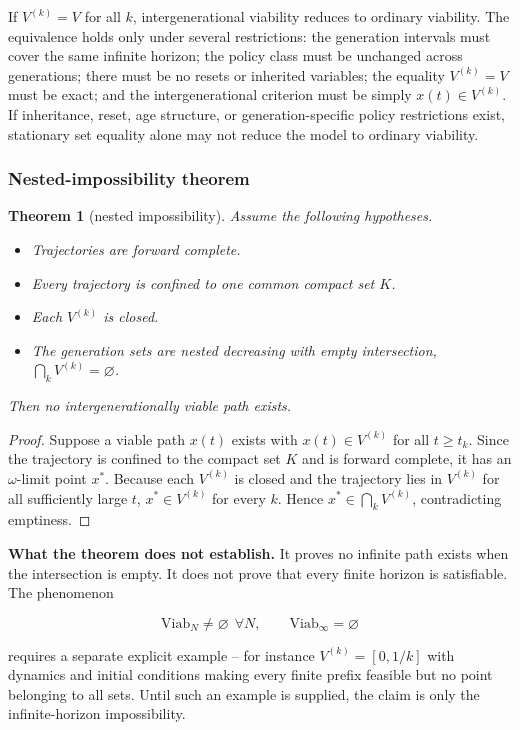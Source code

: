 \documentclass[preprint,11pt,authoryear]{elsarticle}
\newtheorem{theorem}{Theorem}
\theoremstyle{remark}
\begin{document}
If $V^{(k)} = V$ for all $k$, intergenerational viability reduces to ordinary viability. The equivalence holds only under several restrictions: the generation intervals must cover the same infinite horizon; the policy class must be unchanged across generations; there must be no resets or inherited variables; the equality $V^{(k)} = V$ must be exact; and the intergenerational criterion must be simply $x(t) \in V^{(k)}$. If inheritance, reset, age structure, or generation-specific policy restrictions exist, stationary set equality alone may not reduce the model to ordinary viability.

\subsubsection{Nested-impossibility theorem}

\begin{theorem}[nested impossibility]\label{thm:si:nested}
Assume the following hypotheses.
\begin{itemize}[leftmargin=3em]
\item[(H1)] Trajectories are forward complete.
\item[(H2)] Every trajectory is confined to one common compact set $K$.
\item[(H3)] Each $V^{(k)}$ is closed.
\item[(H4)] The generation sets are nested decreasing with empty intersection, $\bigcap_k V^{(k)} = \varnothing$.
\end{itemize}
Then no intergenerationally viable path exists.
\end{theorem}
\begin{proof}
Suppose a viable path $x(t)$ exists with $x(t) \in V^{(k)}$ for all $t \ge t_k$. Since the trajectory is confined to the compact set $K$ and is forward complete, it has an $\omega$-limit point $x^\ast$. Because each $V^{(k)}$ is closed and the trajectory lies in $V^{(k)}$ for all sufficiently large $t$, $x^\ast\in V^{(k)}$ for every $k$. Hence $x^\ast\in\bigcap_k V^{(k)}$, contradicting emptiness.
\end{proof}

\textbf{What the theorem does not establish.} It proves no infinite path exists when the intersection is empty. It does not prove that every finite horizon is satisfiable. The phenomenon

\[\mathrm{Viab}_N \neq \varnothing \ \ \forall N, \qquad \mathrm{Viab}_\infty = \varnothing\]

requires a separate explicit example -- for instance $V^{(k)} = [0, 1/k]$ with dynamics and initial conditions making every finite prefix feasible but no point belonging to all sets. Until such an example is supplied, the claim is only the infinite-horizon impossibility.
\end{document}
